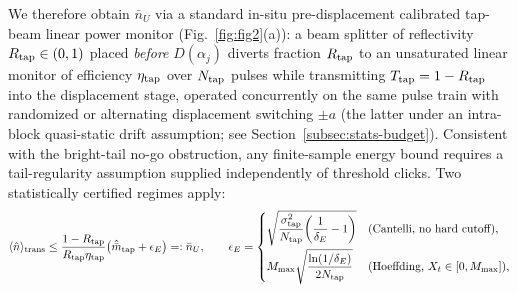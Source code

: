 \documentclass{iopjournal}
\newcommand{\nU}{\bar n_U}
\begin{document}
We therefore obtain $\nU$ via a standard in-situ pre-displacement calibrated tap-beam linear power monitor (Fig.~\ref{fig:fig2}(a)): a beam splitter of reflectivity $R_{\rm tap} \in (0,1)$ placed \emph{before} $D(\alpha_j)$ diverts fraction $R_{\rm tap}$ to an unsaturated linear monitor of efficiency $\eta_{\rm tap}$ over $N_{\rm tap}$ pulses while transmitting $T_{\rm tap} = 1 - R_{\rm tap}$ into the displacement stage, operated concurrently on the same pulse train with randomized or alternating displacement switching $\pm a$ (the latter under an intra-block quasi-static drift assumption; see Section~\ref{subsec:stats-budget}). Consistent with the bright-tail no-go obstruction, any finite-sample energy bound requires a tail-regularity assumption supplied independently of threshold clicks. Two statistically certified regimes apply:
\begin{equation}\label{eq:tap-bound}
\langle\hat n\rangle_{\rm trans} \le \frac{1 - R_{\rm tap}}{R_{\rm tap}\eta_{\rm tap}}\bigl(\hat{\bar m}_{\rm tap} + \epsilon_E\bigr) =: \nU, \qquad
\epsilon_E =
\begin{cases}
\sqrt{\dfrac{\sigma_{\rm tap}^2}{N_{\rm tap}}\!\left(\dfrac{1}{\delta_E}-1\right)} & \text{(Cantelli, no hard cutoff)}, \\[10pt]
M_{\max}\sqrt{\dfrac{\ln(1/\delta_E)}{2N_{\rm tap}}} & \text{(Hoeffding, } X_t \in [0, M_{\max}]\text{)},
\end{cases}
\end{equation}
\end{document}
